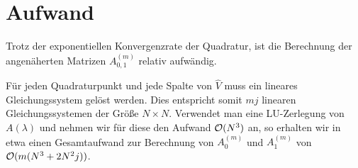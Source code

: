 \section{Aufwand}

Trotz der exponentiellen Konvergenzrate der Quadratur, ist die Berechnung der angenäherten Matrizen $A_{0, 1}^{(m)}$ relativ aufwändig.

Für jeden Quadraturpunkt und jede Spalte von $\hat V$ muss ein lineares Gleichungssystem gelöst werden.
Dies entspricht somit $m j$ linearen Gleichungssystemen der Größe $N \times N$.
Verwendet man eine LU-Zerlegung von $A(\lambda)$ und nehmen wir für diese den Aufwand $\mathcal{O}(N^3)$ an, so erhalten wir in etwa einen Gesamtaufwand zur Berechnung von $A_0^{(m)}$ und $A_1^{(m)}$ von $\mathcal{O}(m (N^3 + 2 N^2 j))$.
